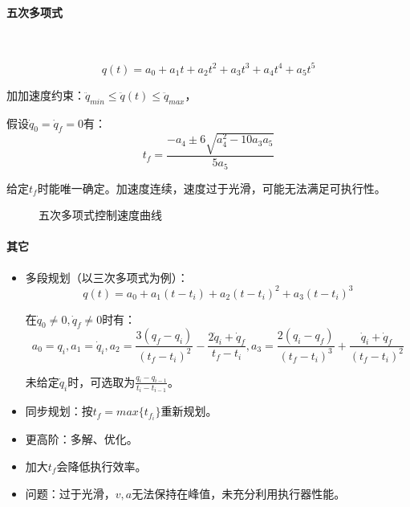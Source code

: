 \documentclass[
12pt, %
a4paper, 
oneside, %
headinclude,footinclude, %
]{scrartcl}
\begin{document}
\paragraph{五次多项式}~\\
\begin{minipage}{0.6\textwidth}
$$ q(t) = a_0 + a_1 t + a_2 t^2 + a_3 t^3 + a_4 t^4 + a_5 t^5 $$

\hspace{2em}
加加速度约束：$ \ddot{q}_{min} \leq \ddot{q}(t) \leq \ddot{q}_{max} $，

\hspace{2em}
假设$ \dot{q}_0 = \dot{q}_f = 0 $有：
$$ t_f = \frac{-a_4 \pm 6 \sqrt{a_4^2 - 10 a_3 a_5}}{5a_5} $$ 

\hspace{2em}
给定$ t_f $时能唯一确定。加速度连续，速度过于光滑，可能无法满足可执行性。
\end{minipage}
\begin{minipage}{0.4\textwidth}
\begin{figure}[H]
\centering
{}
\caption{五次多项式控制速度曲线}
\end{figure}
\end{minipage}
\paragraph{其它}
\begin{itemize}
\item 多段规划（以三次多项式为例）：
$$ q(t) = a_0 + a_1(t - t_i) + a_2(t - t_i)^2 + a_3(t - t_i)^3 $$

在$ \dot{q}_0 \neq 0, \dot{q}_f \neq 0 $时有：
$$ a_0 = q_i, a_1 = \dot{q}_i, a_2 = \frac{3(q_f - q_i)}{(t_f - t_i)^2} - \frac{2\dot{q}_i + \dot{q}_f}{t_f - t_i}, a_3 = \frac{2(q_i - q_f)}{(t_f - t_i)^3} + \frac{\dot{q}_i + \dot{q}_f}{(t_f - t_i)^2} $$

未给定$ \dot{q}_i $时，可选取为$ \frac{q_i - q_{i - 1}}{t_i - t_{i - 1}} $。
\item 同步规划：按$ t_f = max\{t_{f_i}\} $重新规划。
\item 更高阶：多解、优化。
\item 加大$ t_f $会降低执行效率。
\item 问题：过于光滑，$ v, a $无法保持在峰值，未充分利用执行器性能。
\end{itemize}
\end{document}
